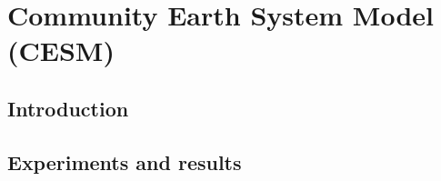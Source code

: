 \section{Community Earth System Model (CESM)}

\subsection{Introduction}

\subsection{Experiments and results}



